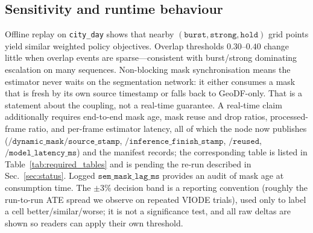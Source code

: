\documentclass{ieeeaccess}
\begin{document}
\subsection{Sensitivity and runtime behaviour}
\label{sec:runtime}
Offline replay on \texttt{city\_day} shows that nearby \((\texttt{burst},\texttt{strong},\texttt{hold})\) grid points yield similar weighted policy objectives.
Overlap thresholds \(0.30\)--\(0.40\) change little when overlap events are sparse---consistent with burst/strong dominating escalation on many sequences.
Non-blocking mask synchronisation means the estimator never waits on the segmentation network: it either consumes a mask that is fresh by its own source timestamp or falls back to GeoDF-only. That is a statement about the coupling, not a real-time guarantee. A real-time claim additionally requires end-to-end mask age, mask reuse and drop ratios, processed-frame ratio, and per-frame estimator latency, all of which the node now publishes (\(\texttt{/dynamic\_mask/source\_stamp}\), \(\texttt{/inference\_finish\_stamp}\), \(\texttt{/reused}\), \(\texttt{/model\_latency\_ms}\)) and the manifest records; the corresponding table is listed in Table~\ref{tab:required_tables} and is pending the re-run described in Sec.~\ref{sec:status}.
Logged \(\texttt{sem\_mask\_lag\_ms}\) provides an audit of mask age at consumption time.
The \(\pm3\%\) decision band is a reporting convention (roughly the run-to-run ATE spread we observe on repeated VIODE trials), used only to label a cell better/similar/worse; it is not a significance test, and all raw deltas are shown so readers can apply their own threshold.
\end{document}
